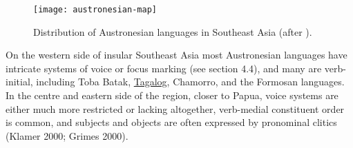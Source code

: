 \begin{figure}[htbp]
\parindent0pt
\centering
\texttt{[image: austronesian-map]}

\caption[Distribution of Austronesian languages in Southeast Asia]{Distribution of Austronesian languages in Southeast Asia (after ).}
\end{figure}


On the western side of insular
Southeast Asia most Austronesian languages have intricate systems of voice
or focus marking (see section 4.4), and many are verb-initial, including Toba
Batak, \hyperref[s:tagalog]{Tagalog}, Chamorro, and the Formosan languages. In the centre and
eastern side of the region, closer to Papua, voice systems are either much
more restricted or lacking altogether, verb-medial constituent order is
common, and subjects and objects are often expressed by pronominal clitics
(Klamer 2000; Grimes 2000).


















